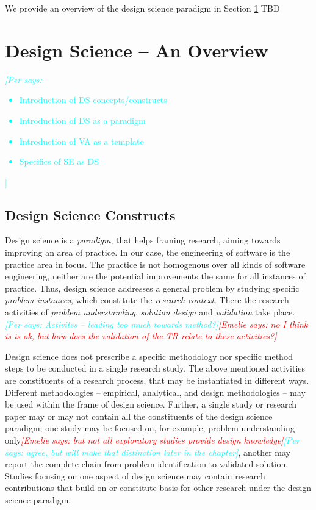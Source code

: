 \documentclass[graybox]{svmult}
\newcommand{\emelie}[1]{\textcolor{red}{{\it [Emelie says: #1]}}}
\newcommand{\per}[1]{\textcolor{cyan}{{\it [Per says: #1]}}}
\newcommand{\emelie}[1]{}
\newcommand{\per}[1]{}
\begin{document}
We provide an overview of the design science paradigm in Section \ref{sec:overview} TBD

\section{Design Science -- An Overview}
\label{sec:overview}
\per{\begin{itemize}
\item Introduction of DS concepts/constructs
\item Introduction of DS as a paradigm
\item Introduction of VA as a template
\item Specifics of SE as DS
\end{itemize}}

\subsection{Design Science Constructs}

Design science is a \emph{paradigm}, that helps framing research, aiming towards improving an area of practice. In our case, the engineering of software is the practice area in focus. The practice is not homogenous over all kinds of software engineering, neither are the potential improvements the same for all instances of practice. Thus, design science addresses a general problem by studying  specific \emph{problem instances}, which constitute the \emph{research context}.  There the research activities of \emph{problem understanding}, \emph{solution design} and \emph{validation} take place. \per{Activites -- leading too much towards method?}\emelie{no I think is is ok, but how does the validation of the TR relate to these activities?}

Design science does not prescribe a specific methodology nor specific method steps to be conducted in a single research study. The above mentioned activities are constituents of  a research process, that may be instantiated in different ways. Different methodologies -- empirical, analytical, and  design methodologies -- may be used within the frame of design science. Further, a single study or research paper may or may not contain all the constituents of the design science paradigm; one study may be focused on, for example,  problem understanding only\emelie{but not all exploratory studies provide design knowledge}\per{agree, but will make that distinction later in the chapter}, another may report the complete chain from problem identification to validated solution. Studies focusing on one aspect of design science may contain research contributions that build on or constitute basis for other research under the design science paradigm.
\end{document}

